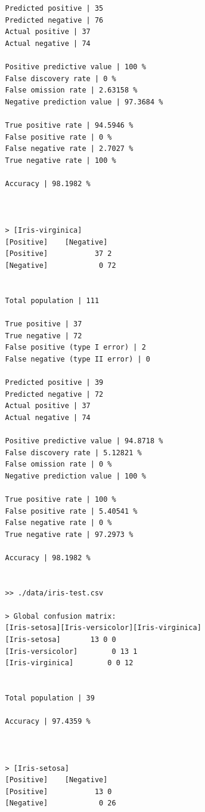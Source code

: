 \documentclass{classrep}
\begin{document}
{{{\begin{lstlisting}
                Predicted positive | 35
                Predicted negative | 76
                Actual positive | 37
                Actual negative | 74

                Positive predictive value | 100 %
                False discovery rate | 0 %
                False omission rate | 2.63158 %
                Negative prediction value | 97.3684 %

                True positive rate | 94.5946 %
                False positive rate | 0 %
                False negative rate | 2.7027 %
                True negative rate | 100 %

                Accuracy | 98.1982 %



                > [Iris-virginica]
                [Positive]    [Negative]
                [Positive]           37 2
                [Negative]            0 72


                Total population | 111

                True positive | 37
                True negative | 72
                False positive (type I error) | 2
                False negative (type II error) | 0

                Predicted positive | 39
                Predicted negative | 72
                Actual positive | 37
                Actual negative | 74

                Positive predictive value | 94.8718 %
                False discovery rate | 5.12821 %
                False omission rate | 0 %
                Negative prediction value | 100 %

                True positive rate | 100 %
                False positive rate | 5.40541 %
                False negative rate | 0 %
                True negative rate | 97.2973 %

                Accuracy | 98.1982 %


                >> ./data/iris-test.csv

                > Global confusion matrix:
                [Iris-setosa][Iris-versicolor][Iris-virginica]
                [Iris-setosa]       13 0 0
                [Iris-versicolor]        0 13 1
                [Iris-virginica]        0 0 12


                Total population | 39

                Accuracy | 97.4359 %



                > [Iris-setosa]
                [Positive]    [Negative]
                [Positive]           13 0
                [Negative]            0 26



\end{lstlisting}}}}
\end{document}
